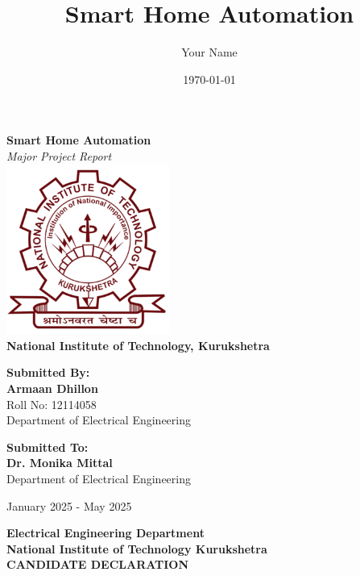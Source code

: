 \documentclass[a4paper,12pt]{report}
\title{\textbf{Smart Home Automation}}
\author{Your Name}
\date{\today}
\begin{document}
\begin{titlepage}
    \centering

    {\Huge \textbf{Smart Home Automation}}\\[0.5cm]
    {\Large \textit{Major Project Report}}\\[1.5cm]

    \includegraphics[width=0.4\textwidth]{nitkkr.png}\\[1cm] %

    \textbf{\Large National Institute of Technology, Kurukshetra}\\[1cm]
    
    \begin{minipage}[t]{0.45\textwidth}
        \raggedright
        \textbf{\large Submitted By:}\\
        {\Large \textbf{Armaan Dhillon}}\\
        {\large Roll No: 12114058}\\
        {\large Department of Electrical Engineering}\\
    \end{minipage}
    \hfill
    \begin{minipage}[t]{0.45\textwidth}
        \raggedleft
        \textbf{\large Submitted To:}\\
        {\Large \textbf{Dr. Monika Mittal}}\\
        {\large Department of Electrical Engineering}\\
    \end{minipage}

    \vfill

    {\large January 2025 - May 2025}
\end{titlepage}

\begin{center}
    \textbf{Electrical Engineering Department}\\
    \textbf{National Institute of Technology Kurukshetra}\\[1cm]
    
    \textbf{\Large CANDIDATE DECLARATION}\\
    \hrulefill
\end{center}
\end{document}
